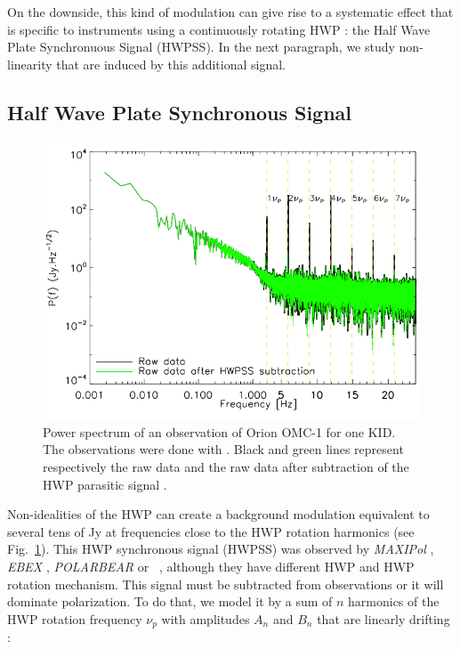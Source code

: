 On the downside, this kind of modulation can give rise to a systematic effect that is specific to instruments using a continuously rotating HWP : the Half Wave Plate Synchronuous Signal (HWPSS). In the next paragraph, we study non-linearity that are induced by this additional signal.

\subsection{Half Wave Plate Synchronous Signal}

\begin{figure}[h]
\center
\includegraphics[clip, angle=0, width=\columnwidth]{Figures/hwp_power_spectrum.png}
\caption{Power spectrum of an observation of Orion OMC-1 for one KID. The observations were done with \nika . Black and green lines represent respectively the raw data and the raw data after subtraction of the HWP parasitic signal \citep{2017A&A...599A..34R}. }
\label{fig:hwp_power_spectrum}
\end{figure}

Non-idealities of the HWP can create a background modulation equivalent to several tens of Jy at frequencies close to the HWP rotation harmonics \citep{2017A&A...599A..34R} (see Fig.~\ref{fig:hwp_power_spectrum}). This HWP synchronous signal (HWPSS) was observed by \emph{MAXIPol} \citep{2007ApJ...665...42J}, \emph{EBEX} \citep{2010SPIE.7741E..1CR}, \emph{POLARBEAR} \citep{2017JCAP...05..008T} or \nika\ \citep{2017A&A...599A..34R}, although they have different HWP and HWP rotation mechanism. This signal must be subtracted from observations or it will dominate polarization. To do that, we model it by a sum of $n$ harmonics of the HWP rotation frequency $\nu_{p}$ with amplitudes $A_{n}$ and $B_{n}$ that are linearly drifting :

